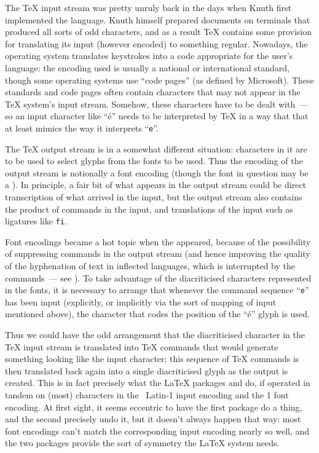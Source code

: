 The \TeX{} input stream was pretty unruly back in the days when Knuth
first implemented the language.  Knuth himself prepared documents on
terminals that produced all sorts of odd characters, and as a result
\TeX{} contains some provision for translating its input (however
encoded) to something regular.  Nowadays, 
the operating system translates keystrokes into a code appropriate for
the user's language: the encoding used is usually a national or
international standard, though some operating systems use ``code
pages'' (as defined by Microsoft).  These standards and code pages often
contain characters that may not appear in the \TeX{} system's input
stream.  Somehow, these characters have to be dealt with~--- so
an input character like ``\'e'' needs to be interpreted by \TeX{} in
a way that that at least mimics the way it interprets ``\texttt{e}''.  

The \TeX{} output stream is in a somewhat different situation:
characters in it are to be used to select glyphs from the fonts to be
used.  Thus the encoding of the output stream is notionally a font
encoding (though the font in question may be a
%
).  In principle, a
fair bit of what appears in the output stream could be direct
transcription of what arrived in the input, but the output stream
also contains the product of commands in the input, and translations
of the input such as ligatures like %
\texttt{fi}.

Font encodings became a hot topic when the
appeared, because of the possibility of suppressing
 commands in the output stream (and hence improving the
quality of the hyphenation of text in inflected languages, which is
interrupted by the  commands~--- see
).
To take advantage of the diacriticised characters represented in the
fonts, it is necessary to arrange that whenever the
command sequence ``\texttt{e}'' has been input
(explicitly, or implicitly via the sort of mapping of input mentioned
above), the character that codes the position of the ``\'e'' glyph is
used.

Thus we could have the odd arrangement that the diacriticised character in
the \TeX{} input stream is translated into \TeX{} commands that would
generate something looking like the input character; this sequence of
\TeX{} commands is then translated back again into a single
diacriticised glyph as the output is created.  This is in fact
precisely what the \LaTeX{} packages  and
 do, if operated in tandem on (most) characters in
the ~Latin-1 input encoding and the 1 font encoding.
At first sight, it seems eccentric to have the first package do a thing, and
the second precisely undo it, but it doesn't always happen that way:
most font encodings can't match the corresponding input encoding
nearly so well, and the two packages provide the sort of symmetry the
\LaTeX{} system needs.

